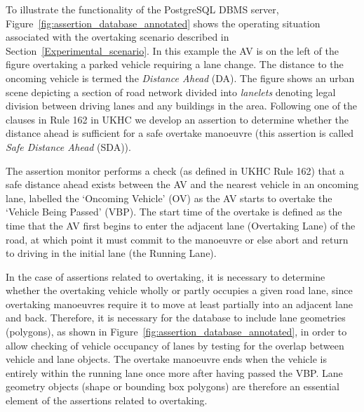 To illustrate the functionality of the PostgreSQL DBMS server, Figure~\ref{fig:assertion_database_annotated} shows the operating situation associated with the overtaking scenario described in Section~\ref{Experimental_scenario}. 
%
In this example the AV is on the left of the figure overtaking a parked vehicle requiring a lane change. The distance to the oncoming vehicle is termed the \emph{Distance Ahead} (DA). 
%
The figure shows an urban scene depicting a section of road network divided into \emph{lanelets} denoting legal division between driving lanes and any buildings in the area. 
%
Following one of the clauses in Rule 162 in UKHC we develop an assertion to determine whether the distance ahead is sufficient for a safe overtake manoeuvre (this assertion is called \emph{Safe Distance Ahead} (SDA)). 
%

The assertion monitor performs a check (as defined in UKHC Rule 162) that a safe distance ahead exists between the AV and the nearest vehicle in an oncoming lane, labelled the `Oncoming Vehicle' (OV) as the AV starts to overtake the `Vehicle Being Passed' (VBP). The start time of the overtake is defined as the time that the AV first begins to enter the adjacent lane (Overtaking Lane) of the road, at which point it must commit to the manoeuvre or else abort and return to driving in the initial lane (the Running Lane).

In the case of assertions related to overtaking, it is necessary to determine whether the overtaking vehicle wholly or partly occupies a given road lane, since overtaking manoeuvres require it to move at least partially into an adjacent lane and back. Therefore, it is necessary for the database to include lane geometries (polygons), as shown in Figure~\ref{fig:assertion_database_annotated}, in order to allow checking of vehicle occupancy of lanes by testing for the overlap between vehicle and lane objects. 
The overtake manoeuvre ends when the vehicle is entirely within the running lane once more after having passed the VBP. Lane geometry objects (shape or bounding box polygons) are therefore an essential element of the assertions related to overtaking. 


